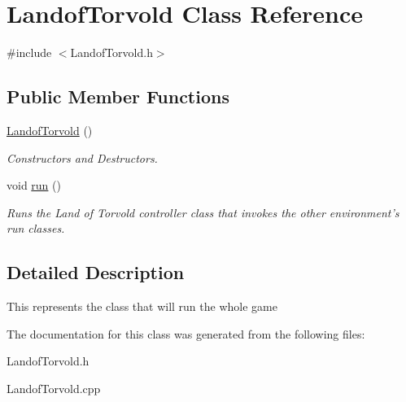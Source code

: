 \hypertarget{classLandofTorvold}{
\section{LandofTorvold Class Reference}
\label{classLandofTorvold}
}


{\ttfamily \#include $<$LandofTorvold.h$>$}\subsection*{Public Member Functions}
\begin{DoxyCompactItemize}
\item 
\hypertarget{classLandofTorvold_a1f23bf2996aeda2defaa5ba2e8a4e3e5}{
\hyperlink{classLandofTorvold_a1f23bf2996aeda2defaa5ba2e8a4e3e5}{LandofTorvold} ()}
\label{classLandofTorvold_a1f23bf2996aeda2defaa5ba2e8a4e3e5}

\begin{DoxyCompactList}\small\item\em Constructors and Destructors. \item\end{DoxyCompactList}\item 
\hypertarget{classLandofTorvold_acfc219cfc76280f6394ad416e3bf748f}{
void \hyperlink{classLandofTorvold_acfc219cfc76280f6394ad416e3bf748f}{run} ()}
\label{classLandofTorvold_acfc219cfc76280f6394ad416e3bf748f}

\begin{DoxyCompactList}\small\item\em Runs the Land of Torvold controller class that invokes the other environment's run classes. \item\end{DoxyCompactList}\end{DoxyCompactItemize}


\subsection{Detailed Description}
This represents the class that will run the whole game 

The documentation for this class was generated from the following files:\begin{DoxyCompactItemize}
\item 
LandofTorvold.h\item 
LandofTorvold.cpp\end{DoxyCompactItemize}
